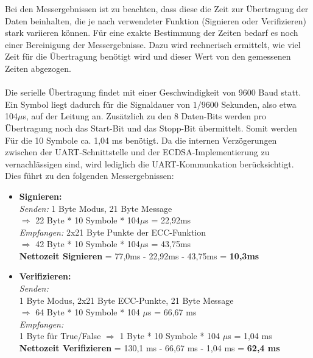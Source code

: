 Bei den Messergebnissen ist zu beachten, dass diese die Zeit zur Übertragung der Daten beinhalten, die je nach verwendeter Funktion (Signieren oder Verifizieren) stark variieren können. Für eine exakte Bestimmung der Zeiten bedarf es noch einer Bereinigung der Messergebnisse. Dazu wird rechnerisch ermittelt, wie viel Zeit für die Übertragung benötigt wird und dieser Wert von den gemessenen Zeiten abgezogen. 
\\ \\
Die serielle Übertragung findet mit einer Geschwindigkeit von 9600 Baud statt. Ein Symbol liegt dadurch für die Signaldauer von $1/9600$ Sekunden, also etwa 104$\mu$s, auf der Leitung an. Zusätzlich zu den 8 Daten-Bits werden pro Übertragung noch das Start-Bit und das Stopp-Bit übermittelt. Somit werden Für die 10 Symbole ca. 1,04 ms benötigt. Da die internen Verzögerungen zwischen der UART-Schnittstelle und der ECDSA-Implementierung zu vernachlässigen sind, wird lediglich die UART-Kommunkation berücksichtigt. Dies führt zu den folgenden Messergebnissen:
\\
\begin{itemize}
	\item \textbf{Signieren:}\\
\textit{Senden:} 
1 Byte Modus, 21 Byte Message\\
$\Rightarrow$ 22 Byte * 10 Symbole * 104$\mu$s = 22,92ms\\
\textit{Empfangen:} 
2x21 Byte Punkte der ECC-Funktion\\
$\Rightarrow$ 42 Byte  * 10 Symbole * 104$\mu$s = 43,75ms \\
\textbf{Nettozeit Signieren} = 77,0ms - 22,92ms - 43,75ms = \textbf{10,3ms}
	
	\item \textbf{Verifizieren:}\\
\textit{Senden:}\\
1 Byte Modus, 2x21 Byte ECC-Punkte, 21 Byte Message\\
$\Rightarrow$ 64 Byte * 10 Symbole * 104 $\mu$s = 66,67 ms\\
\textit{Empfangen:}\\
1 Byte für True/False
$\Rightarrow$ 1 Byte  * 10 Symbole * 104 $\mu$s = 1,04 ms \\
\textbf{Nettozeit Verifizieren} = 130,1 ms - 66,67 ms - 1,04 ms = \textbf{62,4 ms}\\
\end{itemize}

